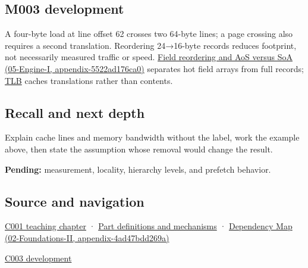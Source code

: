 \subsection{M003 development}\label{m003-development}

A four-byte load at line offset 62 crosses two 64-byte lines; a page crossing also requires a second translation. Reordering 24→16-byte records reduces footprint, not necessarily measured traffic or speed. \href{}{Field reordering and AoS versus SoA (05-Engine-I, appendix-5522ad176ca0)} separates hot field arrays from full records; \hyperref[appendix-7a2d9c5ce511]{TLB} caches translations rather than contents.

\subsection{Recall and next depth}\label{recall-and-next-depth}

Explain cache lines and memory bandwidth without the label, work the example above, then state the assumption whose removal would change the result.

\textbf{Pending:} measurement, locality, hierarchy levels, and prefetch behavior.

\subsection{Source and navigation}\label{source-and-navigation}

\href{Continuous\%20Notes/Computing\%20Foundations\%20-\%20From\%20Bits\%20to\%20C++\%20and\%20Systems\%20APIs\#From\%20a\%20signal\%20to\%20an\%20interpretation}{C001 teaching chapter} · \hyperref[appendix-fd090d982a15]{Part definitions and mechanisms} · \href{}{Dependency Map (02-Foundations-II, appendix-4ad47bdd269a)}

\href{Continuous\%20Notes/Computing\%20Foundations\%20-\%20From\%20Bits\%20to\%20C++\%20and\%20Systems\%20APIs\#Where\%20the\%20bytes\%20live}{C003 development}
